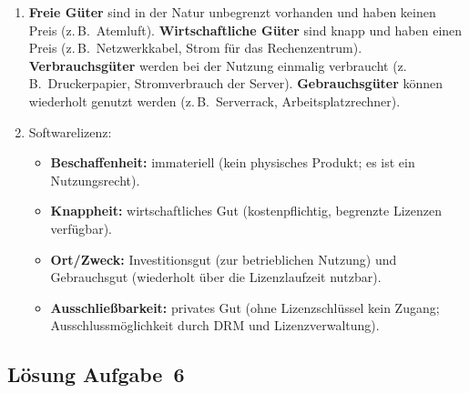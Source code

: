 \documentclass[11pt, a4paper]{article}
\begin{document}
\begin{enumerate}[label=(\alph*)]
  \item \textbf{Freie Güter} sind in der Natur unbegrenzt vorhanden und haben keinen Preis
  (z.\,B.\ Atemluft). \textbf{Wirtschaftliche Güter} sind knapp und haben einen Preis
  (z.\,B.\ Netzwerkkabel, Strom für das Rechenzentrum). \textbf{Verbrauchsgüter} werden
  bei der Nutzung einmalig verbraucht (z.\,B.\ Druckerpapier, Stromverbrauch der Server).
  \textbf{Gebrauchsgüter} können wiederholt genutzt werden (z.\,B.\ Serverrack, Arbeitsplatz\-rechner).

  \item Softwarelizenz:
  \begin{itemize}
    \item \textbf{Beschaffenheit:} immateriell (kein physisches Produkt; es ist ein Nutzungsrecht).
    \item \textbf{Knappheit:} wirtschaftliches Gut (kostenpflichtig, begrenzte Lizenzen verfügbar).
    \item \textbf{Ort/Zweck:} Investitionsgut (zur betrieblichen Nutzung) und Gebrauchsgut
    (wiederholt über die Lizenzlaufzeit nutzbar).
    \item \textbf{Ausschließbarkeit:} privates Gut (ohne Lizenzschlüssel kein Zugang;
    Ausschlussmöglichkeit durch DRM und Lizenzverwaltung).
  \end{itemize}
\end{enumerate}

\subsection*{Lösung Aufgabe~6}
\end{document}
